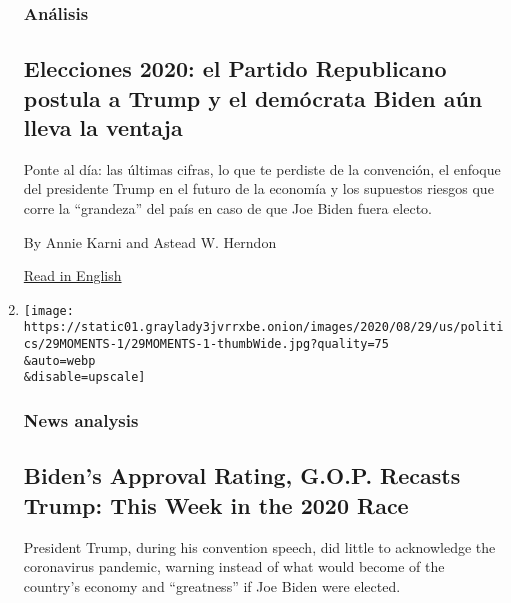\begin{enumerate}
{  \subsubsection{Análisis}\label{anuxe1lisis}}

  \hypertarget{elecciones-2020-el-partido-republicano-postula-a-trump-y-el-demuxf3crata-biden-auxfan-lleva-la-ventaja}{%
  \subsection{Elecciones 2020: el Partido Republicano postula a Trump y
  el demócrata Biden aún lleva la
  ventaja}\label{elecciones-2020-el-partido-republicano-postula-a-trump-y-el-demuxf3crata-biden-auxfan-lleva-la-ventaja}}

  Ponte al día: las últimas cifras, lo que te perdiste de la convención,
  el enfoque del presidente Trump en el futuro de la economía y los
  supuestos riesgos que corre la ``grandeza'' del país en caso de que
  Joe Biden fuera electo.

  By Annie Karni and Astead W. Herndon

  \href{https://www.nytimes3xbfgragh.onion/2020/08/29/us/politics/rnc-trump-biden-polls.html}{Read
  in English}
\item
  \href{/2020/08/29/us/politics/rnc-trump-biden-polls.html}{}

  \texttt{[image: https://static01.graylady3jvrrxbe.onion/images/2020/08/29/us/politics/29MOMENTS-1/29MOMENTS-1-thumbWide.jpg?quality=75\\\&auto=webp\\\&disable=upscale]}

  \hypertarget{news-analysis-1}{%
  \subsubsection{News analysis}\label{news-analysis-1}}

  \hypertarget{bidens-approval-rating-gop-recasts-trump-this-week-in-the-2020-race}{%
  \subsection{Biden's Approval Rating, G.O.P. Recasts Trump: This Week
  in the 2020
  Race}\label{bidens-approval-rating-gop-recasts-trump-this-week-in-the-2020-race}}

  President Trump, during his convention speech, did little to
  acknowledge the coronavirus pandemic, warning instead of what would
  become of the country's economy and ``greatness'' if Joe Biden were
  elected.


\end{enumerate}
